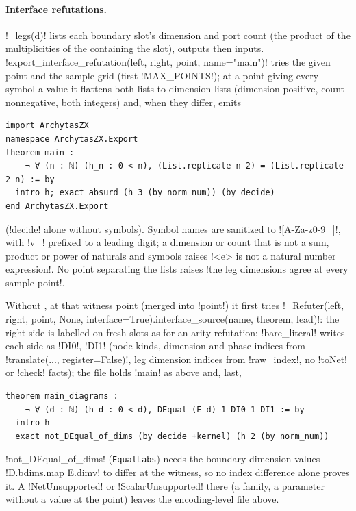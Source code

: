{{{\paragraph{Interface refutations.} \lexpy!_legs(d)! lists each boundary slot's dimension and port
count (the product of the multiplicities of the \bboxes containing the slot), outputs then
inputs. \lexpy!export_interface_refutation(left, right, point, name="main")! tries the given point
and the sample grid (first \lexpy!MAX_POINTS!); at a point giving every symbol a value it flattens
both lists to dimension lists (dimension positive, count nonnegative, both integers) and, when
they differ, emits
\begin{lstlisting}[style=lexlean]
import ArchytasZX
namespace ArchytasZX.Export
theorem main :
    ¬ ∀ (n : ℕ) (h_n : 0 < n), (List.replicate n 2) = (List.replicate 2 n) := by
  intro h; exact absurd (h 3 (by norm_num)) (by decide)
end ArchytasZX.Export
\end{lstlisting}
(\lexcode!decide! alone without symbols). Symbol names are sanitized to \lexcode![A-Za-z0-9_]!, with
\lexcode!v_! prefixed to a leading digit; a dimension or count that is not a sum, product or power
of naturals and symbols raises \lexcode!<e> is not a natural number expression!. No point separating
the lists raises \lexcode!the leg dimensions agree at every sample point!.

Without \bboxes, at that witness point (merged into \lexpy!point!) it first tries
\lexpy!_Refuter(left, right, point, None, interface=True).interface_source(name, theorem, lead)!:
the right side is labelled on fresh slots as for an arity refutation; \lexpy!bare_literal! writes
each side as \lexlean!DI0!, \lexlean!DI1! (node kinds, dimension and phase indices from
\lexpy!translate(..., register=False)!, leg dimension indices from \lexpy!raw_index!, no
\lexlean!toNet! or \lexlean!check! facts); the file holds \lexlean!main! as above and, last,
\begin{lstlisting}[style=lexlean]
theorem main_diagrams :
    ¬ ∀ (d : ℕ) (h_d : 0 < d), DEqual (E d) 1 DI0 1 DI1 := by
  intro h
  exact not_DEqual_of_dims (by decide +kernel) (h 2 (by norm_num))
\end{lstlisting}
\lexlean!not_DEqual_of_dims! (\texttt{EqualLabs}) needs the boundary dimension values
\lexlean!D.bdims.map E.dimv! to differ at the witness, so no index difference alone proves it. A
\lexpy!NetUnsupported! or \lexpy!ScalarUnsupported! there (a family, a parameter without a value at
the point) leaves the encoding-level file above.

}}}
